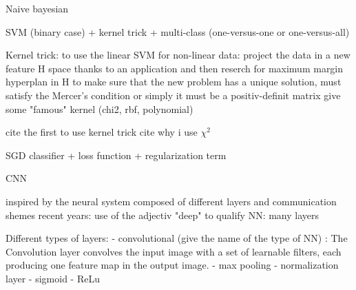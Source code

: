 Naive bayesian

SVM (binary case) + kernel trick + multi-class (one-versus-one or one-versus-all)

Kernel trick:
to use the linear SVM for non-linear data: project the data in a new feature H space thanks to an application and then reserch for maximum margin hyperplan in H
to make sure that the new problem has a unique solution, 
must satisfy the Mercer's condition or simply it must be a positiv-definit matrix
give some "famous" kernel (chi2, rbf, polynomial)

cite the first to use kernel trick
cite why i use $\chi^2$

SGD classifier + loss function + regularization term%

CNN

inspired by the neural system composed of different layers and communication shemes
recent years: use of the adjectiv "deep" to qualify NN: many layers

Different types of layers:
- convolutional (give the name of the type of NN) : The Convolution layer convolves the input image with a set of learnable filters, each producing one feature map in the output image.
- max pooling
- normalization layer %
- sigmoid
- ReLu